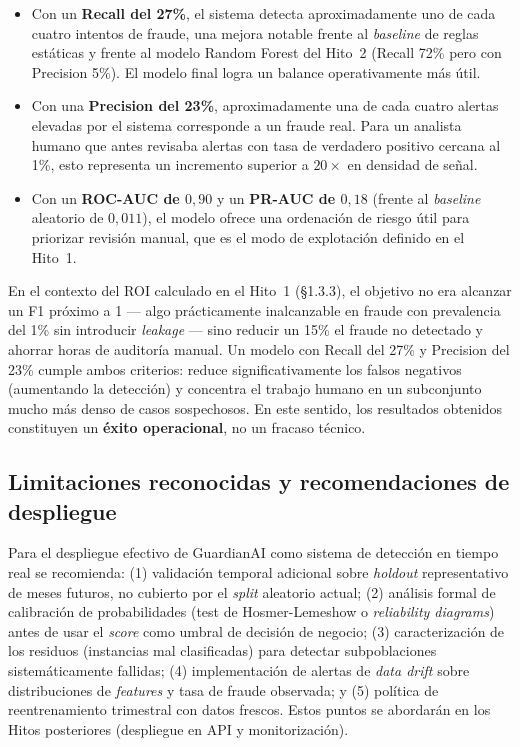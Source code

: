 \documentclass[12pt,a4paper]{report}
\begin{document}
\begin{itemize}
    \item Con un \textbf{Recall del 27\%}, el sistema detecta aproximadamente uno de cada cuatro intentos de fraude, una mejora notable frente al \textit{baseline} de reglas estáticas y frente al modelo Random Forest del Hito~2 (Recall 72\% pero con Precision 5\%). El modelo final logra un balance operativamente más útil.
    \item Con una \textbf{Precision del 23\%}, aproximadamente una de cada cuatro alertas elevadas por el sistema corresponde a un fraude real. Para un analista humano que antes revisaba alertas con tasa de verdadero positivo cercana al 1\%, esto representa un incremento superior a $20\times$ en densidad de señal.
    \item Con un \textbf{ROC-AUC de $0{,}90$} y un \textbf{PR-AUC de $0{,}18$} (frente al \textit{baseline} aleatorio de $0{,}011$), el modelo ofrece una ordenación de riesgo útil para priorizar revisión manual, que es el modo de explotación definido en el Hito~1.
\end{itemize}

En el contexto del ROI calculado en el Hito~1 (\S 1.3.3), el objetivo no era alcanzar un F1 próximo a 1 --- algo prácticamente inalcanzable en fraude con prevalencia del 1\% sin introducir \textit{leakage} --- sino reducir un 15\% el fraude no detectado y ahorrar horas de auditoría manual. Un modelo con Recall del 27\% y Precision del 23\% cumple ambos criterios: reduce significativamente los falsos negativos (aumentando la detección) y concentra el trabajo humano en un subconjunto mucho más denso de casos sospechosos. En este sentido, los resultados obtenidos constituyen un \textbf{éxito operacional}, no un fracaso técnico.

\subsection*{Limitaciones reconocidas y recomendaciones de despliegue}

Para el despliegue efectivo de GuardianAI como sistema de detección en tiempo real se recomienda: (1) validación temporal adicional sobre \textit{holdout} representativo de meses futuros, no cubierto por el \textit{split} aleatorio actual; (2) análisis formal de calibración de probabilidades (test de Hosmer-Lemeshow o \textit{reliability diagrams}) antes de usar el \textit{score} como umbral de decisión de negocio; (3) caracterización de los residuos (instancias mal clasificadas) para detectar subpoblaciones sistemáticamente fallidas; (4) implementación de alertas de \textit{data drift} sobre distribuciones de \textit{features} y tasa de fraude observada; y (5) política de reentrenamiento trimestral con datos frescos. Estos puntos se abordarán en los Hitos posteriores (despliegue en API y monitorización).
\end{document}
